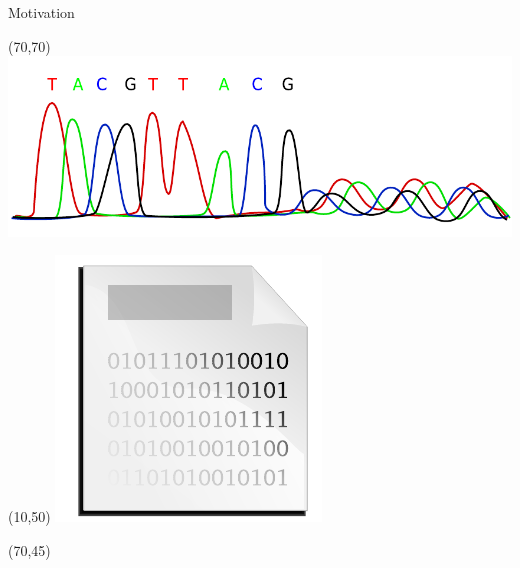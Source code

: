 \documentclass{beamer}
\begin{document}
\begin{frame}[t]{Motivation}
\begin{textblock}{50}(70,70)
	\includegraphics[width=1\linewidth]{electropherogram}
\end{textblock}
\begin{textblock}{25}(10,50)
	\includegraphics[width=1\linewidth]{binary-file}
\end{textblock}
\begin{textblock}{20}(70,45)

\end{textblock}
\end{frame}
\end{document}

